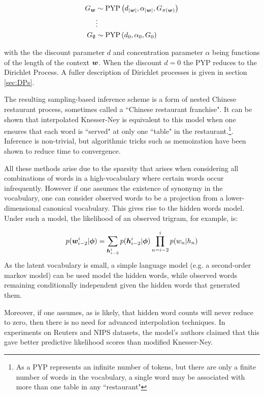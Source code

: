 \begin{align}
G_{\bm w} & \sim \text{PYP}\left(d_{|\bm w|}, \alpha_{|\bm w|}, G_{\pi(\bm w)} \right) \\
& \vdots \\
G_{\emptyset} &\sim \text{PYP}\left(d_0, \alpha_0, G_0\right)
\end{align}

with the the discount parameter $d$ and concentration parameter $\alpha$ being functions of the length of the context $\bm w$. When the discount $d=0$ the PYP reduces to the Dirichlet Process. A fuller description of Dirichlet processes is given in section \ref{sec:DPs}.

The resulting sampling-based inference scheme is a form of nested Chinese restaurant process, sometimes called a ``Chinese restaurant franchise". It can be shown that interpolated Knesser-Ney is equivalent to this model when one ensures that each word is ``served" at only one ``table" in the restaurant.\footnote{As a PYP represents an infinite number of tokens, but there are only a finite number of words in the vocabulary, a single word may be associated with more than one table in any ``restaurant"}. Inference is non-trivial, but algorithmic tricks such as memoization have been shown\cite{Wood2011} to reduce time to convergence.

All these methods arise due to the sparsity that arises when considering all combinations of words in a high-vocabulary where certain words occur infrequently. However if one assumes the existence of synonymy in the vocabulary, one can consider observed words to be a projection from a lower-dimensional canonical vocabulary. This gives rise to the hidden words model\cite{Deschacht2012}. Under such a model, the likelihood of an observed trigram, for example, is:

\begin{align}
p(\bm w^i_{i-2}|\bm \phi) = \sum_{\bm h^i_{i-2}} p(\bm h^i_{i-2}|\bm \phi) \prod_{n=i-2}^i p(w_n | h_n)
\end{align}
As the latent vocabulary is small, a simple language model (e.g. a second-order markov model) can be used model the hidden words, while observed words remaining conditionally independent given the hidden words that generated them. 
 
Moreover, if one assumes, as is likely, that hidden word counts will never reduce to zero, then there is no need for advanced interpolation techniques. In experiments on Reuters and NIPS datasets, the model's authors claimed that this gave better predictive likelihood scores than modified Knesser-Ney.


